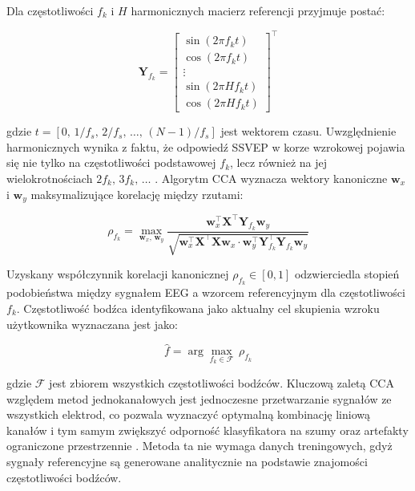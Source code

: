 Dla częstotliwości $f_k$ i $H$ harmonicznych macierz referencji przyjmuje
postać:

\begin{equation}
    \mathbf{Y}_{f_k} =
    \begin{bmatrix}
        \sin(2\pi f_k t) \\
        \cos(2\pi f_k t) \\
        \vdots \\
        \sin(2\pi H f_k t) \\
        \cos(2\pi H f_k t)
    \end{bmatrix}^{\!\top}
    \label{eq:cca_ref_teoria}
\end{equation}

\noindent gdzie $t = [0,\, 1/f_s,\, 2/f_s,\, \ldots,\, (N-1)/f_s]$ jest
wektorem czasu. Uwzględnienie harmonicznych wynika z faktu, że odpowiedź
SSVEP w korze wzrokowej pojawia się nie tylko na częstotliwości podstawowej
$f_k$, lecz również na jej wielokrotnościach $2f_k,\, 3f_k,\,\ldots$
\cite{vialatte2010}. Algorytm CCA wyznacza wektory kanoniczne
$\mathbf{w}_x$ i $\mathbf{w}_y$ maksymalizujące korelację między rzutami:

\begin{equation}
    \rho_{f_k} = \max_{\mathbf{w}_x,\,\mathbf{w}_y}
    \frac{\mathbf{w}_x^{\top} \mathbf{X}^{\top} \mathbf{Y}_{f_k}
        \mathbf{w}_y}
        {\sqrt{\mathbf{w}_x^{\top} \mathbf{X}^{\top} \mathbf{X}
                \mathbf{w}_x \cdot
                \mathbf{w}_y^{\top} \mathbf{Y}_{f_k}^{\top}
                \mathbf{Y}_{f_k} \mathbf{w}_y}}
    \label{eq:cca_max}
\end{equation}

\noindent Uzyskany współczynnik korelacji kanonicznej
$\rho_{f_k} \in [0, 1]$ odzwierciedla stopień podobieństwa między sygnałem
EEG a wzorcem referencyjnym dla częstotliwości $f_k$.
Częstotliwość bodźca identyfikowana jako aktualny cel skupienia wzroku
użytkownika wyznaczana jest jako:

\begin{equation}
    \hat{f} = \arg\max_{f_k \in \mathcal{F}} \, \rho_{f_k}
    \label{eq:cca_argmax_teoria}
\end{equation}

\noindent gdzie $\mathcal{F}$ jest zbiorem wszystkich częstotliwości bodźców.
Kluczową zaletą CCA względem metod jednokanałowych jest jednoczesne
przetwarzanie sygnałów ze wszystkich elektrod, co pozwala wyznaczyć
optymalną kombinację liniową kanałów i tym samym zwiększyć odporność
klasyfikatora na szumy oraz artefakty ograniczone przestrzennie
\cite{friman2007, bin2009}. Metoda ta nie wymaga danych treningowych, gdyż
sygnały referencyjne są generowane analitycznie na podstawie znajomości
częstotliwości bodźców.




